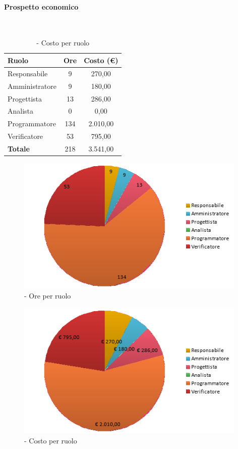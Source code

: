 \documentclass[./PianoDiProgetto.tex]{subfiles}
\begin{document}
	\paragraph{Prospetto economico}\

	\begin{table}[H]
		\centering

		\begin{tabular}{l * {2}{c}}
			\toprule
			\textbf{Ruolo} & \textbf{Ore} & \textbf{Costo (\euro{})} \\
			\midrule
			Responsabile & 9    &  270,00 \\
			Amministratore  & 9    &  180,00 \\
			Progettista  & 13   &  286,00 \\
			Analista & 0    &  0,00 \\
			Programmatore  & 134    &  2.010,00 \\
			Verificatore  & 53    &  795,00 \\
			\midrule
			\textbf{Totale}  & 218   &  3.541,00 \\
			\bottomrule
		\end{tabular}
		\caption{\PerC{} - Costo per ruolo}
	\end{table}

\vspace{35mm}

	\begin{figure}[H]
		\centering
		\includegraphics[width=11cm, trim=1cm 0cm 1cm 0cm]{grafici/C-ruolo}
			\caption{\PerC{} - Ore per ruolo}
	\end{figure}
\vfill
	\begin{figure}[H]
		\centering
		\includegraphics[width=11cm, trim=1cm 0cm 1cm 0cm]{grafici/C-costo}
			\caption{\PerC{} - Costo per ruolo}
	\end{figure}
\end{document}
